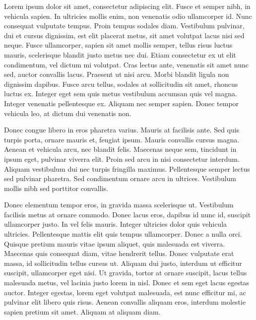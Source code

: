 \documentclass[a4paper, 11pt, titlepage, twocolumn]{article}
\begin{document}
Lorem ipsum dolor sit amet, consectetur adipiscing elit. Fusce et semper nibh, in vehicula sapien. In ultricies mollis enim, non venenatis odio ullamcorper id. Nunc consequat vulputate tempus. Proin tempus sodales diam. Vestibulum pulvinar, dui et cursus dignissim, est elit placerat metus, sit amet volutpat lacus nisi sed neque. Fusce ullamcorper, sapien sit amet mollis semper, tellus risus luctus mauris, scelerisque blandit justo metus nec dui. Etiam consectetur ex ut elit condimentum, vel dictum mi volutpat. Cras lectus ante, venenatis sit amet nunc sed, auctor convallis lacus. Praesent ut nisi arcu. Morbi blandit ligula non dignissim dapibus. Fusce arcu tellus, sodales at sollicitudin sit amet, rhoncus luctus ex. Integer eget sem quis metus vestibulum accumsan quis vel magna. Integer venenatis pellentesque ex. Aliquam nec semper sapien. Donec tempor vehicula leo, at dictum dui venenatis non.

Donec congue libero in eros pharetra varius. Mauris at facilisis ante. Sed quis turpis porta, ornare mauris et, feugiat ipsum. Mauris convallis cursus magna. Aenean et vehicula arcu, nec blandit felis. Maecenas neque sem, tincidunt in ipsum eget, pulvinar viverra elit. Proin sed arcu in nisi consectetur interdum. Aliquam vestibulum dui nec turpis fringilla maximus. Pellentesque semper lectus sed pulvinar pharetra. Sed condimentum ornare arcu in ultrices. Vestibulum mollis nibh sed porttitor convallis.

Donec elementum tempor eros, in gravida massa scelerisque ut. Vestibulum facilisis metus at ornare commodo. Donec lacus eros, dapibus id nunc id, suscipit ullamcorper justo. In vel felis mauris. Integer ultricies dolor quis vehicula ultricies. Pellentesque mattis elit quis tempus ullamcorper. Donec a nulla orci. Quisque pretium mauris vitae ipsum aliquet, quis malesuada est viverra. Maecenas quis consequat diam, vitae hendrerit tellus. Donec vulputate erat massa, id sollicitudin tellus cursus ut. Aliquam dui justo, interdum ut efficitur suscipit, ullamcorper eget nisi. Ut gravida, tortor at ornare suscipit, lacus tellus malesuada metus, vel lacinia justo lorem in nisl. Donec et sem eget lacus egestas auctor. Integer egestas, lorem eget volutpat malesuada, est nunc efficitur mi, ac pulvinar elit libero quis risus. Aenean convallis aliquam eros, interdum molestie sapien pretium sit amet. Aliquam at aliquam diam.
\end{document}
